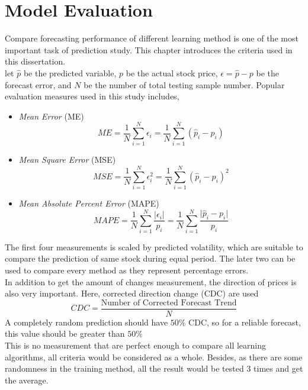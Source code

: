 \chapter{Model Evaluation}
\label{ch:modelEval}

Compare forecasting performance of different learning method is one of the most important task of prediction study. This chapter introduces the criteria used in this dissertation.\\


let $ \hat{p} $ be the predicted variable, $ p $ be the actual stock price, $ \epsilon = \hat{p} - p $ be the forecast error, and $ N $ be the number of total testing sample number. Popular evaluation measures used in this study includes\cite[Section~2.2, p.~23--24]{poon2005practical},
\begin{itemize}
	\item \textit{Mean Error} (ME)
	\begin{equation}
	ME=\frac{1}{N} \sum_{i=1}^{N}\epsilon_i=\frac{1}{N} \sum_{i=1}^{N} (\hat{p}_i - p_i)
	\end{equation}
	
	\item \textit{Mean Square Error} (MSE)
	\begin{equation}
	MSE = \frac{1}{N} \sum_{i=1}^{N}\epsilon_i^2=\frac{1}{N} \sum_{i=1}^{N} (\hat{p}_i - p_i)^2
	\end{equation}
	
	\item \textit{Mean Absolute Percent Error} (MAPE)
	\begin{equation}
	MAPE=\frac{1}{N} \sum_{i=1}^{N} \frac{\lvert \epsilon_i \rvert}{p_i} =\frac{1}{N} \sum_{i=1}^{N} \frac{\lvert \hat{p}_i - p_i \rvert}{p_i}
	\end{equation}
\end{itemize}
The first four measurements is scaled by predicted volatility, which are suitable to compare the prediction of same stock during equal period. The later two can be used to compare every method as they represent percentage errors.\\


In addition to get the amount of changes measurement, the direction of prices is also very important. Here, corrected direction change (CDC)\cite{naeini2010stock} are used
\begin{equation}
CDC = \frac{\text{Number of Corrected Forecast Trend}}{N}
\end{equation}
A completely random prediction should have $ 50\% $ CDC, so for a reliable forecast, this value should be greater than $ 50\% $\\


This is no measurement that are perfect enough to compare all learning algorithms, all criteria would be considered as a whole. Besides, as there are some randomness in the training method, all the result would be tested 3 times and get the average.